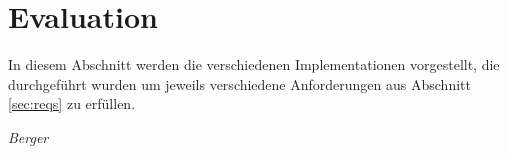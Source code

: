 \section{Evaluation}
In diesem Abschnitt werden die verschiedenen Implementationen vorgestellt,
die durchgeführt wurden um jeweils verschiedene Anforderungen
aus Abschnitt \ref{sec:reqs} zu erfüllen.
\begin{flushright}
\emph{Berger}
\end{flushright}








